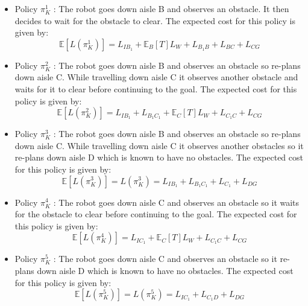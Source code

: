 \documentclass[a4paper,12pt]{article}
\begin{document}
			\begin{itemize}
				\item Policy $\pi_{K}^{1}$ : The robot goes down aisle B and observes an obstacle. It then decides to wait for the obstacle to clear. The expected cost for this policy is given by:
				\begin{equation}
				\mathbb{E}\left[L\left(\pi_{K}^{1}\right)\right] = L_{IB_1} + \mathbb{E}_{B}\left[T\right]L_W + L_{B_1B} + L_{BC} + L_{CG}
				\label{eqn:policyOneCost}
				\end{equation}
				
				\item Policy $\pi_{K}^{2}$ : The robot goes down aisle B and observes an obstacle so re-plans down aisle C. While travelling down aisle C it observes another obstacle and waits for it to clear before continuing to the goal. The expected cost for this policy is given by:
				\begin{equation}
				\mathbb{E}\left[L\left(\pi_{K}^{2}\right)\right] = L_{IB_1} + L_{B_1C_1} + \mathbb{E}_{C}\left[T\right]L_W + L_{C_1C} + L_{CG}
				\label{eqn:policyTwoCost}
				\end{equation}
				
				\item Policy $\pi_{K}^{3}$ : The robot goes down aisle B and observes an obstacle so re-plans down aisle C. While travelling down aisle C it observes another obstacles so it re-plans down aisle D which is known to have no obstacles. The expected cost for this policy is given by:
				\begin{equation}
				\mathbb{E}\left[L\left(\pi_{K}^{3}\right)\right] = L\left(\pi_{K}^{3}\right) = L_{IB_1} + L_{B_1C_1} + L_{C_1} + L_{DG}
				\label{eqn:policyThreeCost}
				\end{equation}
				
				\item Policy $\pi_{K}^{4}$ : The robot goes down aisle C and observes an obstacle so it waits for the obstacle to clear before continuing to the goal. The expected cost for this policy is given by:
				\begin{equation}
				\mathbb{E}\left[L\left(\pi_{K}^{4}\right)\right] = L_{IC_1} + \mathbb{E}_{C}\left[T\right]L_W + L_{C_1C} + L_{CG}
				\label{eqn:policyFourCost}
				\end{equation}
				
				\item Policy $\pi_{K}^{5}$ : The robot goes down aisle C and observes an obstacle so it re-plans down aisle D which is known to have no obstacles. The expected cost for this policy is given by:
				\begin{equation}
				\mathbb{E}\left[L\left(\pi_{K}^{5}\right)\right] = L\left(\pi_{K}^{5}\right) = L_{IC_1} + L_{C_1D} + L_{DG}
				\label{eqn:policyFiveCost}
				\end{equation}
				

\end{itemize}
\end{document}
